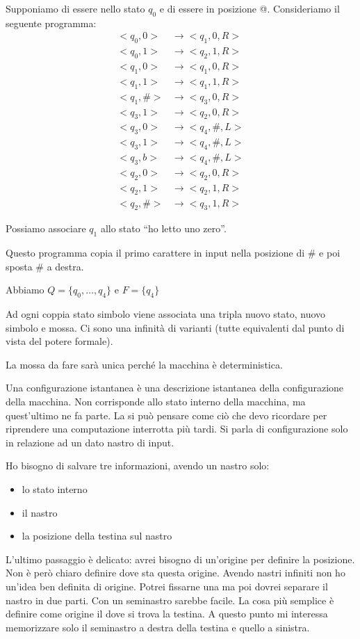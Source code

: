 Supponiamo di essere nello stato $q_{0}$ e di essere in posizione @. Consideriamo il seguente programma:
\begin{align*}
    <q_{0},0> &\to <q_{1},0,R>\\
    <q_{0},1> &\to <q_{2},1,R>\\
    <q_{1},0> &\to <q_{1},0,R>\\
    <q_{1},1> &\to <q_{1},1,R>\\
    <q_{1},\#> &\to <q_{3},0,R>\\
    <q_{3},1> &\to <q_{2},0,R>\\
    <q_{3},0> &\to <q_{4},\#,L>\\
    <q_{3},1> &\to <q_{4},\#,L>\\
    <q_{3},b> &\to <q_{4},\#,L>\\
    <q_{2},0> &\to <q_{2},0,R>\\
    <q_{2},1> &\to <q_{2},1,R>\\
    <q_{2},\#> &\to <q_{3},1,R>
\end{align*}

Possiamo associare $q_{1}$ allo stato ``ho letto uno zero''.

Questo programma copia il primo carattere in input nella posizione di \# e poi sposta \# a destra.

Abbiamo $Q = \{q_{0},\dotsc,q_{4}\}$ e $F = \{q_{4}\}$

Ad ogni coppia stato simbolo viene associata una tripla nuovo stato, nuovo simbolo e mossa. Ci sono
una infinità di varianti (tutte equivalenti dal punto di vista del potere formale).

La mossa da fare sarà unica perché la macchina è deterministica.

Una configurazione istantanea è una descrizione istantanea della configurazione della macchina. Non
corrisponde allo stato interno della macchina, ma quest'ultimo ne fa parte. La si può pensare come
ciò che devo ricordare per riprendere una computazione interrotta più tardi. Si parla di
configurazione solo in relazione ad un dato nastro di input.

Ho bisogno di salvare tre informazioni, avendo un nastro solo:
\begin{itemize}
    \item lo stato interno
    \item il nastro
    \item la posizione della testina sul nastro
\end{itemize}

L'ultimo passaggio è delicato: avrei bisogno di un'origine per definire la posizione. Non è però
chiaro definire dove sta questa origine. Avendo nastri infiniti non ho un'idea ben definita di
origine. Potrei fissarne una ma poi dovrei separare il nastro in due parti. Con un seminastro
sarebbe facile. La cosa più semplice è definire come origine il dove si trova la testina. A questo
punto mi interessa memorizzare solo il seminastro a destra della testina e quello a sinistra.

